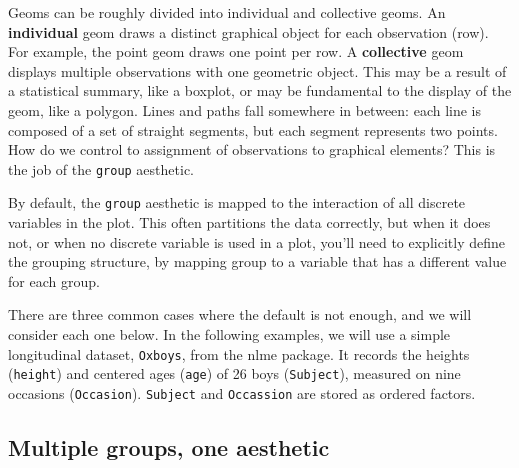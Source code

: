 Geoms can be roughly divided into individual and collective geoms. An
\textbf{individual} geom draws a distinct graphical object for each
observation (row). For example, the point geom draws one point per row.
A \textbf{collective} geom displays multiple observations with one
geometric object. This may be a result of a statistical summary, like a
boxplot, or may be fundamental to the display of the geom, like a
polygon. Lines and paths fall somewhere in between: each line is
composed of a set of straight segments, but each segment represents two
points. How do we control to assignment of observations to graphical
elements? This is the job of the \texttt{group} aesthetic.
  

By default, the \texttt{group} aesthetic is mapped to the interaction of
all discrete variables in the plot. This often partitions the data
correctly, but when it does not, or when no discrete variable is used in
a plot, you'll need to explicitly define the grouping structure, by
mapping group to a variable that has a different value for each group.

There are three common cases where the default is not enough, and we
will consider each one below. In the following examples, we will use a
simple longitudinal dataset, \texttt{Oxboys}, from the nlme package. It
records the heights (\texttt{height}) and centered ages (\texttt{age})
of 26 boys (\texttt{Subject}), measured on nine occasions
(\texttt{Occasion}). \texttt{Subject} and \texttt{Occassion} are stored
as ordered factors.  

\begin{Shaded}
\begin{Highlighting}[]
 \NormalTok{)}
\end{Highlighting}
\end{Shaded}

\subsection{Multiple groups, one aesthetic}

